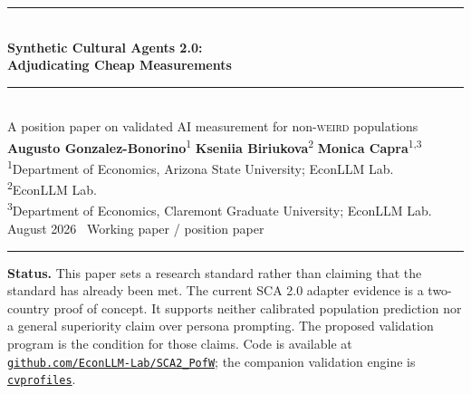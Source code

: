 \documentclass[10pt,letterpaper]{article}
\newcommand{\WEIRD}{\textsc{weird}}
\begin{document}
\thispagestyle{empty}
\begin{center}
\vspace*{1.3cm}
{\color{econblue}\rule{\textwidth}{1.15pt}}\\[0.45em]
{\LARGE\bfseries\color{econblue} Synthetic Cultural Agents 2.0:}\\[0.16em]
{\LARGE\bfseries\color{econblue} Adjudicating Cheap Measurements}\\[0.45em]
{\color{econblue}\rule{\textwidth}{0.55pt}}\\[0.85em]
{\large A position paper on validated AI measurement for non-\WEIRD{} populations}\\[1.0em]
{\large\textbf{Augusto Gonzalez-Bonorino}\textsuperscript{1}\quad
\textbf{Kseniia Biriukova}\textsuperscript{2}\quad
\textbf{Monica Capra}\textsuperscript{1,3}}\\[0.5em]
{\small\textsuperscript{1}Department of Economics, Arizona State University; EconLLM Lab.\\
\textsuperscript{2}EconLLM Lab.\\
\textsuperscript{3}Department of Economics, Claremont Graduate University; EconLLM Lab.}\\[0.8em]
{\normalsize August 2026 \textperiodcentered\ Working paper / position paper}\\[0.4em]
{\color{econblue}\rule{0.28\textwidth}{0.35pt}}
\end{center}

\vfill
\noindent\colorbox{mist}{\parbox{0.965\textwidth}{\small\vspace{0.25em}
\textbf{Status.} This paper sets a research standard rather than claiming that the standard has already been met. The current SCA 2.0 adapter evidence is a two-country proof of concept. It supports neither calibrated population prediction nor a general superiority claim over persona prompting. The proposed validation program is the condition for those claims. Code is available at \href{https://github.com/EconLLM-Lab/SCA2_PofW}{\texttt{github.com/EconLLM-Lab/SCA2\_PofW}}; the companion validation engine is \href{https://github.com/Bonorinoa/cvprofiles}{\texttt{cvprofiles}}.\vspace{0.25em}}}
\newpage
\end{document}
